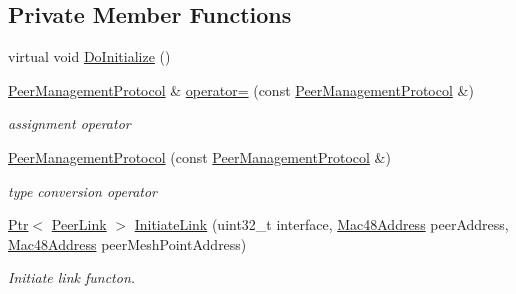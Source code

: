 \subsection*{Private Member Functions}
\begin{DoxyCompactItemize}
\item 
virtual void \hyperlink{classns3_1_1dot11s_1_1PeerManagementProtocol_aad5b740f39d118cebc0e9c4c25348b83}{Do\+Initialize} ()
\item 
\hyperlink{classns3_1_1dot11s_1_1PeerManagementProtocol}{Peer\+Management\+Protocol} \& \hyperlink{classns3_1_1dot11s_1_1PeerManagementProtocol_a2214b045b113e038c71c8a4f297585e0}{operator=} (const \hyperlink{classns3_1_1dot11s_1_1PeerManagementProtocol}{Peer\+Management\+Protocol} \&)
\begin{DoxyCompactList}\small\item\em assignment operator \end{DoxyCompactList}\item 
\hyperlink{classns3_1_1dot11s_1_1PeerManagementProtocol_a47dd2292c4e9c9cabe33d79b77f9f426}{Peer\+Management\+Protocol} (const \hyperlink{classns3_1_1dot11s_1_1PeerManagementProtocol}{Peer\+Management\+Protocol} \&)
\begin{DoxyCompactList}\small\item\em type conversion operator \end{DoxyCompactList}\item 
\hyperlink{classns3_1_1Ptr}{Ptr}$<$ \hyperlink{classns3_1_1dot11s_1_1PeerLink}{Peer\+Link} $>$ \hyperlink{classns3_1_1dot11s_1_1PeerManagementProtocol_a74fcc9fa5c9ffc741f7d89f21a246813}{Initiate\+Link} (uint32\+\_\+t interface, \hyperlink{classns3_1_1Mac48Address}{Mac48\+Address} peer\+Address, \hyperlink{classns3_1_1Mac48Address}{Mac48\+Address} peer\+Mesh\+Point\+Address)
\begin{DoxyCompactList}\small\item\em Initiate link functon. \end{DoxyCompactList}\end{DoxyCompactItemize}
